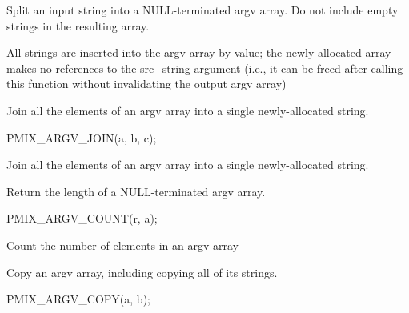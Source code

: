 \begin{arglist}
\end{arglist}

Split an input string into a NULL-terminated argv array. Do not include empty strings in the resulting array.

\adviceuserstart
All strings are inserted into the argv array by value; the newly-allocated array makes no references to the src_string argument (i.e., it can be freed after calling this function without invalidating the output argv array)
\adviceuserend


Join all the elements of an argv array into a single newly-allocated string.

\cspecificstart
\begin{codepar}
PMIX_ARGV_JOIN(a, b, c);
\end{codepar}
\cspecificend

\begin{arglist}
\end{arglist}

Join all the elements of an argv array into a single newly-allocated string.


Return the length of a NULL-terminated argv array.

\cspecificstart
\begin{codepar}
PMIX_ARGV_COUNT(r, a);
\end{codepar}
\cspecificend

\begin{arglist}
\end{arglist}

Count the number of elements in an argv array


Copy an argv array, including copying all of its strings.

\cspecificstart
\begin{codepar}
PMIX_ARGV_COPY(a, b);
\end{codepar}
\cspecificend

